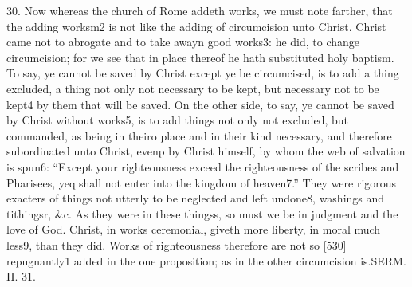 30. Now whereas the church of Rome addeth works, we must note farther, that the adding worksm2 is not like the adding of circumcision unto Christ. Christ came not to abrogate and to take awayn good works3: he did, to change circumcision; for we see that in place thereof he hath substituted holy baptism. To say, ye cannot be saved by Christ except ye be circumcised, is to add a thing excluded, a thing not only not necessary to be kept, but necessary not to be kept4 by them that will be saved. On the other side, to say, ye cannot be saved by Christ without works5, is to add things not only not excluded, but commanded, as being in theiro place and in their kind necessary, and therefore subordinated unto Christ, evenp by Christ himself, by whom the web of salvation is spun6: “Except your righteousness exceed the righteousness of the scribes and Pharisees, yeq shall not enter into the kingdom of heaven7.” They were rigorous exacters of things not utterly to be neglected and left undone8, washings and tithingsr, &c. As they were in these thingss, so must we be in judgment and the love of God. Christ, in works ceremonial, giveth more liberty, in moral much less9, than they did. Works of righteousness therefore are not so [530] repugnantly1 added in the one proposition; as in the other circumcision is.SERM. II. 31.

